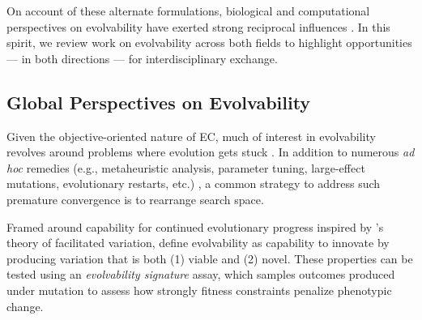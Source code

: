 On account of these alternate formulations, biological and computational perspectives on evolvability have exerted strong reciprocal influences \citep{kirschner2017plausibility,dawkins1989evolution,nuodelarosa2017computing,wagner1996perspective}.
In this spirit, we review work on evolvability across both fields to highlight opportunities --- in both directions --- for interdisciplinary exchange.

\subsection{Global Perspectives on Evolvability}

Given the objective-oriented nature of EC, much of interest in evolvability revolves around problems where evolution gets stuck \citep{crepinsek2013exploration,andre2001improvement,bongard2010guarding,pandey2014comparative,squillero2016divergence}.
In addition to numerous \textit{ad hoc} remedies (e.g., metaheuristic analysis, parameter tuning, large-effect mutations, evolutionary restarts, etc.) \citep{ragusa2022augmenting,wang2018population,dang2016selfadaptation,fogel1994introduction,fouskakis2002stochastic,kirkpatrick1983optimization,de2015money,doerr2014impact}, a common strategy to address such premature convergence is to rearrange search space.

Framed around capability for continued evolutionary progress inspired by \citet{kirschner2017plausibility}'s theory of facilitated variation, \citet{tarapore2015evolvability} define evolvability as capability to innovate by producing variation that is both (1) viable and (2) novel.
These properties can be tested using an \textit{evolvability signature} assay, which samples outcomes produced under mutation to assess how strongly fitness constraints penalize phenotypic change.

